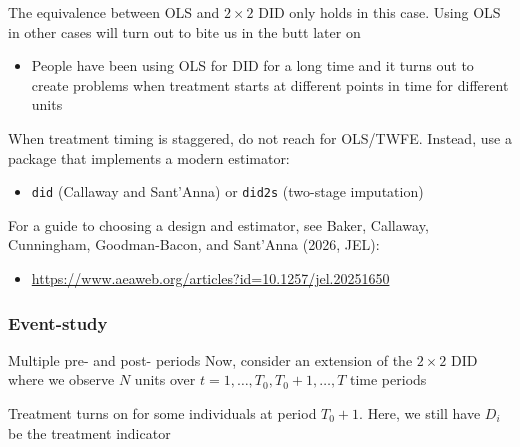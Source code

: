 \documentclass[aspectratio=169,t,11pt,table]{beamer}
\begin{document}
\begin{frame}{}
  The equivalence between OLS and $2 \times 2$ DID only holds in this case. 
  Using OLS in other cases will turn out to bite us in the butt later on
  \begin{itemize}
    \item People have been using OLS for DID for a long time and it turns out to create problems when treatment starts at different points in time for different units
  \end{itemize}

  \pause
  \bigskip
  \alert{When treatment timing is staggered, do not reach for OLS/TWFE.} Instead, use a package that implements a modern estimator:
  \begin{itemize}
    \item \texttt{did} (Callaway and Sant'Anna) or \texttt{did2s} (two-stage imputation)
  \end{itemize}

  \bigskip
  For a guide to choosing a design and estimator, see Baker, Callaway, Cunningham, Goodman-Bacon, and Sant'Anna (2026, JEL):
  \begin{itemize}
    \item \url{https://www.aeaweb.org/articles?id=10.1257/jel.20251650}
  \end{itemize}
\end{frame}

\subsubsection{Event-study}

\begin{frame}{Multiple pre- and post- periods}
  Now, consider an extension of the $2 \times 2$ DID where we observe $N$ units over $t = 1, \dots, T_0, T_0 + 1, \dots, T$ time periods
  
  \bigskip
  Treatment turns on for some individuals at period $T_0 + 1$. Here, we still have $D_i$ be the treatment indicator
\end{frame}
\end{document}
